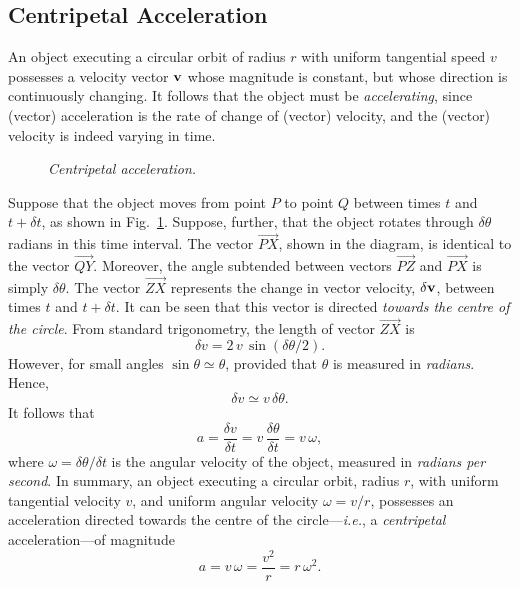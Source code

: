 \subsection{Centripetal Acceleration}
An object executing a circular orbit of radius $r$ with uniform tangential
speed $v$ possesses a velocity vector ${\bf v}$ whose magnitude is constant, but
whose direction is continuously changing. It follows that the object must
be {\em accelerating}, since (vector) acceleration is the rate of change of (vector)
velocity, and the (vector) velocity is indeed varying in time.

\begin{figure}
\epsfysize=3in
\centerline{}
\caption{\em Centripetal acceleration.}\label{f59}  
\end{figure}

Suppose that the object moves from point $P$ to point $Q$ between times $t$ and $t+\delta t$, as
shown in Fig.~\ref{f59}. Suppose, further, that the object  rotates
through $\delta\theta$ radians in this time interval. The vector 
 $\stackrel{\displaystyle \rightarrow}{PX}$, 
shown in the diagram, is identical
to the vector $\stackrel{\displaystyle \rightarrow}{QY}$.  Moreover, the angle subtended between vectors
$\stackrel{\displaystyle \rightarrow}{PZ}$ and  $\stackrel{\displaystyle \rightarrow}{PX}$
is simply $\delta\theta$. The vector $\stackrel{\displaystyle \rightarrow}{ZX}$ represents
the change in vector velocity, $\delta{\bf v}$, between times $t$ and $t+\delta t$. It can be seen
that this vector is directed {\em towards the centre of the circle}. From standard trigonometry,
the length of vector $\stackrel{\displaystyle \rightarrow}{ZX}$ is 
\begin{equation}
\delta v = 2\,v\,\sin(\delta\theta/2).
\end{equation}
However, for small angles $\sin\theta \simeq \theta$, provided that $\theta$ 
is measured in {\em radians}. Hence, 
\begin{equation}
\delta v\simeq v\,\delta\theta.
 \end{equation}
It follows that
\begin{equation}
a = \frac{\delta v}{\delta t} = v\,\frac{\delta\theta}{\delta t} = v\,\omega,
\end{equation}
where $\omega = \delta \theta/\delta t$ is the angular velocity of the object, measured
in {\em radians per second}.
In summary,  an object executing a circular orbit, radius $r$, with uniform tangential
velocity $v$, and uniform angular velocity $\omega=v/r$, possesses an acceleration
directed towards the centre of the circle---{\em i.e.}, a {\em centripetal} acceleration---of
magnitude
\begin{equation}
a = v\,\omega = \frac{v^2}{r} = r\,\omega^2.\label{e715}
\end{equation}

